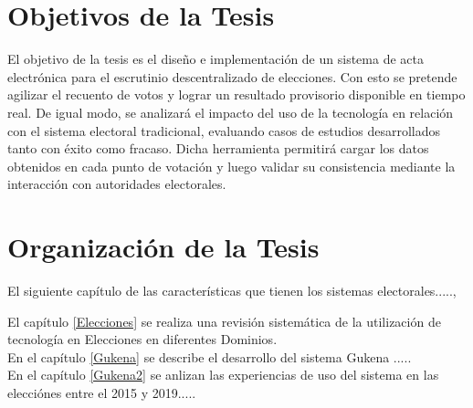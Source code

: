 \section{Objetivos de la Tesis}
El objetivo de la tesis es el diseño e implementación de un sistema de acta electrónica para el escrutinio descentralizado de elecciones. Con esto se pretende agilizar el recuento de votos y lograr un resultado provisorio disponible en tiempo real. De igual modo, se analizará el impacto del uso de la tecnología en relación con el sistema electoral tradicional, evaluando casos de estudios desarrollados tanto con éxito como fracaso.\newline
Dicha herramienta permitirá cargar los datos obtenidos en cada punto de votación y luego validar su consistencia mediante la interacción con autoridades electorales. 

\section{Organización de la Tesis}
El siguiente capítulo de las características que tienen los sistemas electorales.....,

El capítulo \ref{Elecciones} se realiza una revisión sistemática de la utilización de tecnología en  Elecciones en diferentes Dominios.\\

En el capítulo \ref{Gukena} se describe el desarrollo del sistema Gukena .....\\

En el capítulo \ref{Gukena2} se anlizan las experiencias de uso del sistema en las elecciónes entre el 2015 y 2019.....

